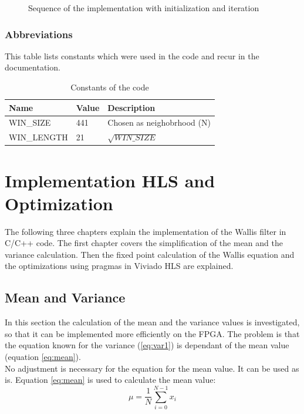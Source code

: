 \begin{figure}[tb!]
    \centering
    \begin{adjustbox}{max width=\textwidth}
        
    \end{adjustbox}
    \caption{Sequence of the implementation with initialization and iteration}
    \label{fig:sequence}
\end{figure}

\subsubsection*{Abbreviations}
This table lists constants which were used in the code and recur in the documentation.

\begin{table}[tb!]
    \centering
    \begin{tabular}{l l l}
        \toprule
        Name & Value & Description  \\
        \midrule
        WIN\_SIZE & 441 & Chosen as neighobrhood (N)
        \\
        WIN\_LENGTH & 21 & $\sqrt{WIN\_SIZE}$ 
        \\
        \bottomrule
    \end{tabular}
    \caption{Constants of the code}
    \label{tab:c_div}
\end{table}


\section{Implementation HLS and Optimization} \label{ch:ip:hls_opt}
The following three chapters explain the implementation of the Wallis filter in
C/C++ code. The first chapter covers the simplification of the mean and the
variance calculation. Then the fixed point calculation of the Wallis equation
and the optimizations using pragmas in Viviado HLS are explained.

\subsection{Mean and Variance} \label{ch:ip:mean_var}
In this section the calculation of the mean and the variance values is
investigated, so that it can be implemented more efficiently on the FPGA. The problem is that the equation known for the variance (\ref{eq:var1}) is dependant of the mean value (equation \ref{eq:mean}).\\
No adjustment is necessary for the equation for the mean value. It can be used as is. Equation \ref{eq:mean} is used to calculate the mean value:
\begin{equation}
    \mu = \frac{1}{N} \sum_{i = 0}^{N - 1} x_{i}
    \label{eq:mean}
\end{equation} 

